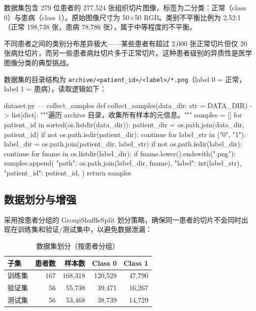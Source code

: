 \documentclass[12pt,a4paper]{ctexart}
\begin{document}
数据集包含 279 位患者的 277,524 张组织切片图像，标签为二分类：正常（class 0）与患病（class 1）。原始图像尺寸为 50$\times$50 RGB。类别不平衡比例为 2.52:1（正常 198,738 张，患病 78,786 张），属于中等程度的不平衡。

不同患者之间的类别分布差异极大——某些患者有超过 2,000 张正常切片但仅 20 张病灶切片，而另一些患者病灶切片多于正常切片。这种患者级别的异质性是医学图像分类的典型挑战。

数据集的目录结构为 \texttt{archive/<patient\_id>/<label>/*.png}（label 0 = 正常，label 1 = 患病），读取逻辑如下：

\begin{pythoncode}{dataset.py — collect\_samples}
def collect_samples(data_dir: str = DATA_DIR) -> list[dict]:
    """遍历 archive 目录，收集所有样本的元信息。"""
    samples = []
    for patient_id in sorted(os.listdir(data_dir)):
        patient_dir = os.path.join(data_dir, patient_id)
        if not os.path.isdir(patient_dir):
            continue
        for label_str in ("0", "1"):
            label_dir = os.path.join(patient_dir, label_str)
            if not os.path.isdir(label_dir):
                continue
            for fname in os.listdir(label_dir):
                if fname.lower().endswith(".png"):
                    samples.append({
                        "path": os.path.join(label_dir, fname),
                        "label": int(label_str),
                        "patient_id": patient_id,
                    })
    return samples
\end{pythoncode}

\subsection{数据划分与增强}

采用按患者分组的 GroupShuffleSplit 划分策略，确保同一患者的切片不会同时出现在训练集和验证/测试集中，以避免数据泄漏：

\begin{table}[H]
\centering
\caption{数据集划分（按患者分组）}
\begin{tabular}{lrrrr}
\toprule
子集 & 患者数 & 样本数 & Class 0 & Class 1 \\
\midrule
训练集 & 167 & 168,318 & 120,528 & 47,790 \\
验证集 & 56  & 55,738  & 39,471  & 16,267 \\
测试集 & 56  & 53,468  & 38,739  & 14,729 \\
\bottomrule
\end{tabular}
\end{table}
\end{document}
